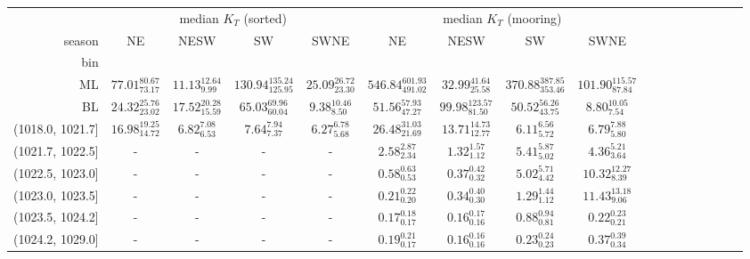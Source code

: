 \begin{tabular}{@{\extracolsep\fill}rcccccccccccccccc}
\toprule
{} & \multicolumn{4}{c}{median $K_T$ (sorted)} & \multicolumn{4}{c}{median $K_T$ (mooring)} \\
season &                       NE &                     NESW &                          SW &                     SWNE &                          NE &                      NESW &                          SW &                       SWNE \\
bin              &                          &                          &                             &                          &                             &                           &                             &                            \\
\midrule
ML               &  $77.01_{73.17}^{80.67}$ &   $11.13_{9.99}^{12.64}$ &  $130.94_{125.95}^{135.24}$ &  $25.09_{23.30}^{26.72}$ &  $546.84_{491.02}^{601.93}$ &   $32.99_{25.58}^{41.64}$ &  $370.88_{353.46}^{387.85}$ &  $101.90_{87.84}^{115.57}$ \\
BL               &  $24.32_{23.02}^{25.76}$ &  $17.52_{15.59}^{20.28}$ &     $65.03_{60.04}^{69.96}$ &    $9.38_{8.50}^{10.46}$ &     $51.56_{47.27}^{57.93}$ &  $99.98_{81.50}^{123.57}$ &     $50.52_{43.75}^{56.26}$ &      $8.80_{7.54}^{10.05}$ \\
(1018.0, 1021.7] &  $16.98_{14.72}^{19.25}$ &     $6.82_{6.53}^{7.08}$ &        $7.64_{7.37}^{7.94}$ &     $6.27_{5.68}^{6.78}$ &     $26.48_{21.69}^{31.03}$ &   $13.71_{12.77}^{14.73}$ &        $6.11_{5.72}^{6.56}$ &       $6.79_{5.80}^{7.88}$ \\
(1021.7, 1022.5] &                        - &                        - &                           - &                        - &        $2.58_{2.34}^{2.87}$ &      $1.32_{1.12}^{1.57}$ &        $5.41_{5.02}^{5.87}$ &       $4.36_{3.64}^{5.21}$ \\
(1022.5, 1023.0] &                        - &                        - &                           - &                        - &        $0.58_{0.53}^{0.63}$ &      $0.37_{0.32}^{0.42}$ &        $5.02_{4.42}^{5.71}$ &     $10.32_{8.39}^{12.27}$ \\
(1023.0, 1023.5] &                        - &                        - &                           - &                        - &        $0.21_{0.20}^{0.22}$ &      $0.34_{0.30}^{0.40}$ &        $1.29_{1.12}^{1.44}$ &     $11.43_{9.06}^{13.18}$ \\
(1023.5, 1024.2] &                        - &                        - &                           - &                        - &        $0.17_{0.17}^{0.18}$ &      $0.16_{0.16}^{0.17}$ &        $0.88_{0.81}^{0.94}$ &       $0.22_{0.21}^{0.23}$ \\
(1024.2, 1029.0] &                        - &                        - &                           - &                        - &        $0.19_{0.17}^{0.21}$ &      $0.16_{0.16}^{0.16}$ &        $0.23_{0.23}^{0.24}$ &       $0.37_{0.34}^{0.39}$ \\
\bottomrule
\end{tabular}
